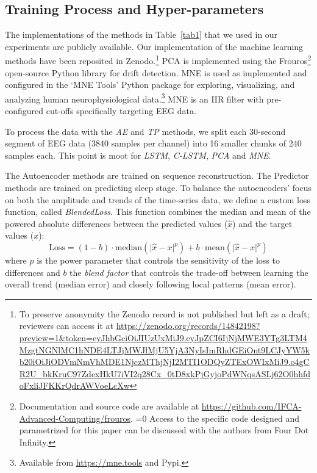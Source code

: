 \documentclass[conference]{IEEEtran}
\def\anon{1}
\begin{document}
\subsection{Training Process and Hyper-parameters}

The implementations of the methods in Table~\ref{tab1} that we used in
our experiments are publicly available. Our implementation of the
machine learning methods have been reposited in Zenodo.\footnote{To preserve
  anonymity the Zenodo record is not published but left as a draft;
  reviewers can access it at
  \url{https://zenodo.org/records/14842198?preview=1&token=eyJhbGciOiJIUzUxMiJ9.eyJpZCI6IjNjMWE3YTg3LTM4MzgtNGNlMC1hNDE4LTJjMWJlMjU5YjA3NyIsImRhdGEiOnt9LCJyYW5kb20iOiJiODVmNmVhMDE1NjczMThjNjI2MTI1ODQyZTExOWIxMiJ9.o4gCR2U_bkKruC97ZdexHkU7iVI2q28Cx_0tD8xkPjGyjoPdWNqsASLj62O0hhfdoFxliJFKKrQdrAWVoeLcXw}}
PCA is implemented using the
Frouros\footnote{Documentation and source code are available at
  \url{https://github.com/IFCA-Advanced-Computing/frouros}.
\ifnum\anon=0
  Access to the specific code designed and parametrized for this
  paper can be discussed with the authors from Four Dot Infinity.
\fi
}
open-source Python library for drift detection.
MNE is used as implemented and configured in the `MNE Tools' Python
package for exploring, visualizing, and analyzing human
neurophysiological data.\footnote{Available from \url{https://mne.tools} and Pypi.}
MNE is an IIR filter with pre-configured cut-offs specifically
targeting EEG data.

To process the data with the \emph{AE} and \emph{TP} methods, we split
each 30-second segment of EEG data (3840 samples per channel) into 16
smaller chunks of 240 samples each. This point is moot for \emph{LSTM},
\emph{C-LSTM}, \emph{PCA} and \emph{MNE}.

The Autoencoder methods are trained on sequence reconstruction. The
Predictor methods are trained on predicting sleep stage.
%
To balance the autoencoders' focus on both the amplitude and trends of the
time-series data, we define a custom loss function, called
\emph{BlendedLoss}. This function combines the median and mean of the
powered absolute differences between the predicted values ($\hat{x}$)
and the target values ($x$):
%
$$
\text{Loss} =
  (1 - b)\cdot\mathrm{median}(\lvert \hat{x} - x \rvert^p) +
  b\cdot\mathrm{mean}(\lvert \hat{x} - x \rvert^p)
$$
%
where $p$ is the power parameter that controls the sensitivity of the
loss to differences and $b$ the \emph{blend factor} that controls
the trade-off between learning the overall trend (median error) and
closely following local patterns (mean error).
\end{document}
